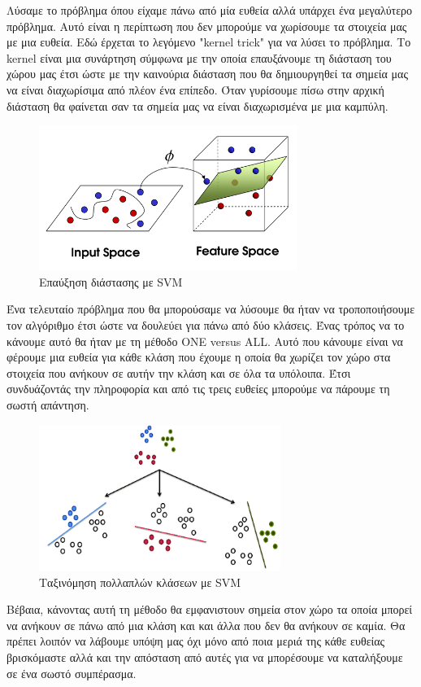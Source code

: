 Λύσαμε το πρόβλημα όπου είχαμε πάνω από μία ευθεία αλλά υπάρχει ένα μεγαλύτερο πρόβλημα. Αυτό
είναι η περίπτωση που δεν μπορούμε να χωρίσουμε τα στοιχεία μας με μια ευθεία. Εδώ έρχεται το
λεγόμενο "\textlatin{kernel trick}" για να λύσει το πρόβλημα. Το \textlatin{kernel} είναι μια
συνάρτηση σύμφωνα με την οποία επαυξάνουμε τη διάσταση του χώρου μας έτσι ώστε με την καινούρια
διάσταση που θα δημιουργηθεί τα σημεία μας να είναι διαχωρίσιμα από πλέον ένα επίπεδο. Όταν
γυρίσουμε πίσω στην αρχική διάσταση θα φαίνεται σαν τα σημεία μας να είναι διαχωρισμένα με μια
καμπύλη.
\begin{figure}[H]
    \centering
    \includegraphics[width=0.75\textwidth]{images/svmdiminc.png}
    \caption{Επαύξηση διάστασης με \textlatin{SVM}}
\end{figure}

Ένα τελευταίο πρόβλημα που θα μπορούσαμε να λύσουμε θα ήταν να τροποποιήσουμε τον αλγόριθμο έτσι
ώστε να δουλεύει για πάνω από δύο κλάσεις. Ένας τρόπος να το κάνουμε αυτό θα ήταν με τη μέθοδο
\textlatin{ONE versus ALL}. Αυτό που κάνουμε είναι να φέρουμε μια ευθεία για κάθε κλάση που έχουμε
η οποία θα χωρίζει τον χώρο στα στοιχεία που ανήκουν σε αυτήν την κλάση και σε όλα τα υπόλοιπα.
Έτσι συνδυάζοντάς την πληροφορία και από τις τρεις ευθείες μπορούμε να πάρουμε τη σωστή απάντηση.
\begin{figure}[H]
    \centering
    \includegraphics[width=0.7\textwidth]{images/svmonevsall.png}
    \caption{Ταξινόμηση πολλαπλών κλάσεων με \textlatin{SVM}}
\end{figure}
Βέβαια, κάνοντας αυτή τη μέθοδο θα εμφανιστουν σημεία στον χώρο τα οποία μπορεί να ανήκουν σε πάνω
από μια κλάση και και άλλα που δεν θα ανήκουν σε καμία. Θα πρέπει λοιπόν να λάβουμε υπόψη μας όχι
μόνο από ποια μεριά της κάθε ευθείας βρισκόμαστε αλλά και την απόσταση από αυτές για να μπορέσουμε
να καταλήξουμε σε ένα σωστό συμπέρασμα.

